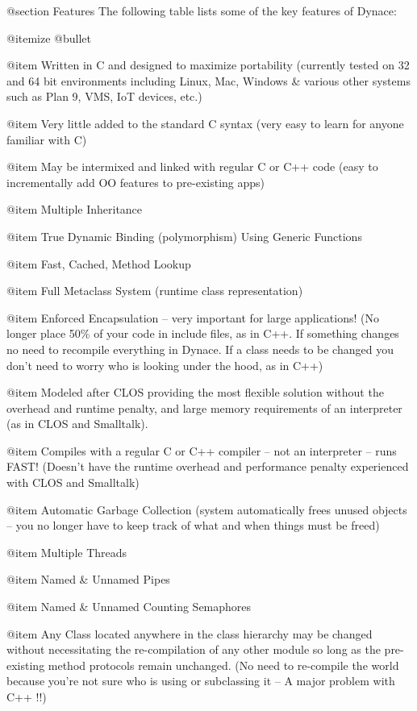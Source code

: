 @section Features
The following table lists some of the key features of Dynace:

@itemize @bullet

@item Written in C and designed to maximize portability (currently tested
on 32 and 64 bit environments including Linux, Mac, Windows &
various other systems such as Plan 9, VMS, IoT devices, etc.)

@item Very little added to the standard C syntax (very easy to learn for
anyone familiar with C)

@item May be intermixed and linked with regular C or C++ code (easy to
incrementally add OO features to pre-existing apps)

@item Multiple Inheritance

@item True Dynamic Binding (polymorphism) Using Generic Functions

@item Fast, Cached, Method Lookup

@item Full Metaclass System (runtime class representation)

@item Enforced Encapsulation -- very important for large 
applications!  (No longer place 50\% of your code in include files, as
in C++. If something changes no need to recompile everything in
Dynace.  If a class needs to be changed you don't need to worry who is
looking under the hood, as in C++)

@item Modeled after CLOS providing the most flexible
solution without the overhead and runtime penalty, and large memory
requirements of an interpreter (as in CLOS and Smalltalk).

@item Compiles with a regular C or C++ compiler -- not an interpreter -- 
runs FAST!  (Doesn't have the runtime overhead and performance penalty
experienced with CLOS and Smalltalk)

@item Automatic Garbage Collection (system automatically frees unused
objects -- you no longer have to keep track of what and when things
must be freed)

@item Multiple Threads

@item Named & Unnamed Pipes

@item Named & Unnamed Counting Semaphores

@item Any Class located anywhere in the class hierarchy may be changed without
necessitating the re-compilation of any other module so long as the
pre-existing method protocols remain unchanged. (No need to re-compile
the world because you're not sure who is using or subclassing it -- A
major problem with C++ !!)

